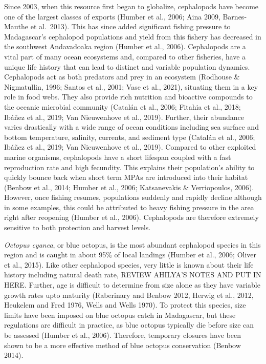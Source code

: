 \documentclass[
]{article}
\begin{document}
Since 2003, when this resource first began to globalize, cephalopods have become one of the largest classes of exports (Humber et al., 2006; Aina 2009, Barnes-Mauthe et al.~2013). This has since added significant fishing pressure to Madagascar's cephalopod populations and yield from this fishery has decreased in the southwest Andavadoaka region (Humber et al., 2006). Cephalopods are a vital part of many ocean ecosystems and, compared to other fisheries, have a unique life history that can lead to distinct and variable population dynamics. Cephalopods act as both predators and prey in an ecosystem (Rodhouse \& Nigmatullin, 1996; Santos et al., 2001; Vase et al., 2021), situating them in a key role in food webs. They also provide rich nutrition and bioactive compounds to the oceanic microbial community (Catalán et al., 2006; Fitahia et al., 2018; Ibáñez et al., 2019; Van Nieuwenhove et al., 2019). Further, their abundance varies drastically with a wide range of ocean conditions including sea surface and bottom temperature, salinity, currents, and sediment type (Catalán et al., 2006; Ibáñez et al., 2019; Van Nieuwenhove et al., 2019). Compared to other exploited marine organisms, cephalopods have a short lifespan coupled with a fast reproduction rate and high fecundity. This explains their population's ability to quickly bounce back when short term MPAs are introduced into their habitat (Benbow et al., 2014; Humber et al., 2006; Katsanevakis \& Verriopoulos, 2006). However, once fishing resumes, populations suddenly and rapidly decline although in some examples, this could be attributed to heavy fishing pressure in the area right after reopening (Humber et al., 2006). Cephalopods are therefore extremely sensitive to both protection and harvest levels.

\emph{Octopus cyanea}, or blue octopus, is the most abundant cephalopod species in this region and is caught in about 95\% of local landings (Humber et al., 2006; Oliver et al., 2015). Like other cephalopod species, very little is known about their life history including natural death rate, REVIEW AHILYA'S NOTES AND PUT IN HERE. Further, age is difficult to determine from size alone as they have variable growth rates upto maturity (Raberinary and Benbow 2012, Herwig et al., 2012, Heukelem and Fred 1976, Wells and Wells 1970). To protect this species, size limits have been imposed on blue octopus catch in Madagascar, but these regulations are difficult in practice, as blue octopus typically die before size can be assessed (Humber et al., 2006). Therefore, temporary closures have been shown to be a more effective method of blue octopus conservation (Benbow 2014).
\end{document}
